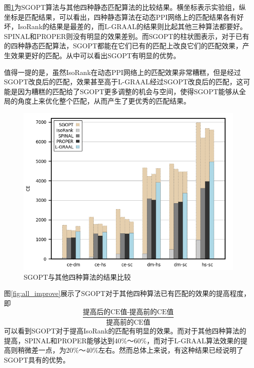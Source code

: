 图\ref{fig:all}为SGOPT算法与其他四种静态匹配算法的比较结果。横坐标表示实验组，纵坐标是匹配结果，可以看出，四种静态算法在动态PPI网络上的匹配结果各有好坏，IsoRank的结果是最差的，而L-GRAAL的结果则比起其他三种算法都要好。SPINAL和PROPER则没有明显的效果差别。而SGOPT的柱状图表示，对于已有的四种静态匹配算法，SGOPT都能在它们已有的匹配上改良它们的匹配效果，产生效果更好的匹配。从中可以看出SGOPT有明显的优势。

值得一提的是，虽然IsoRank在动态PPI网络上的匹配效果非常糟糕，但是经过SGOPT改良后的匹配，效果甚至高于L-GRAAL经过SGOPT改良后的匹配，这可能是因为糟糕的匹配给了SGOPT更多调整的机会与空间，使得SGOPT能够从全局的角度上来优化整个匹配，从而产生了更优秀的匹配结果。

\begin{figure}[htbp]
\centering
\includegraphics[height=0.4\textheight]{pic/all.png}
\caption{SGOPT与其他四种算法的结果比较} 
\label{fig:all}
\end{figure}

图\ref{fig:all_improve}展示了SGOPT对于其他四种算法已有匹配的效果的提高程度，即
\begin{equation}
\frac{\text{提高后的CE值-提高前的CE值}}{\text{提高前的CE值}}    
\end{equation}
可以看到SGOPT对于提高IsoRank的匹配有明显的效果。而对于其他四种算法的提高，SPINAL和PROPER能够达到40\%～60\%，而对于L-GRAAL算法效果的提高则稍微差一点，为20\%～40\%左右。然而总体上来说，有这种结果已经说明了SGOPT具有的优势。


